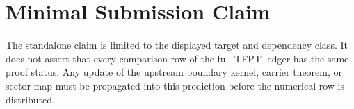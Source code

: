 \documentclass[11pt,a4paper]{article}
\begin{document}
\section{Minimal Submission Claim}
The standalone claim is limited to the displayed target and dependency class. It does not assert
that every comparison row of the full TFPT ledger has the same proof status. Any update of the
upstream boundary kernel, carrier theorem, or sector map must be propagated into this prediction
before the numerical row is distributed.

\PredictionBibliography
\end{document}
